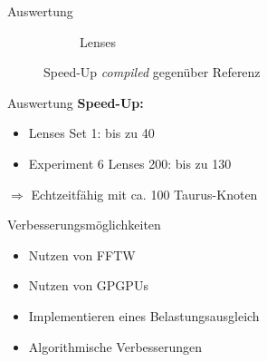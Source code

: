 \begin{frame}{Auswertung}
\begin{center}
\begin{figure}[h]
\begin{subfigure}[b]{0.45\textwidth}
				\caption{Lenses}
			\end{subfigure}
			\caption{Speed-Up \textit{compiled} gegenüber Referenz}
		\end{figure}
	\end{center}
\end{frame}

\begin{frame}{Auswertung}
	\textbf{Speed-Up:}
	\begin{itemize}
		\item Lenses Set 1: bis zu 40
		\item Experiment 6 Lenses 200: bis zu 130
	\end{itemize}
	$ \Rightarrow $ Echtzeitfähig mit ca. 100 Taurus-Knoten
\end{frame}

\begin{frame}{Verbesserungsmöglichkeiten}
	\begin{itemize}
		\item Nutzen von FFTW
		\item Nutzen von GPGPUs
		\item Implementieren eines Belastungsausgleich
		\item Algorithmische Verbesserungen
	\end{itemize}
\end{frame}